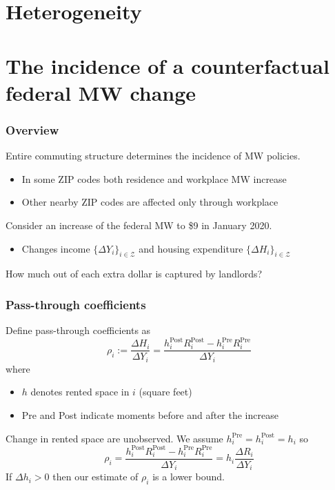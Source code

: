 \documentclass[aspectratio=169, t]{beamer}
\newcommand{\Z}{\mathcal{Z}}
\begin{document}
\section{Heterogeneity}

\section{The incidence of a counterfactual federal MW change}

\begin{frame}
    \frametitle{Overview}
    
    Entire commuting structure determines the incidence of MW policies.
    \begin{itemize}
    	\vspace{1mm}
    	\item In some ZIP codes both residence and workplace MW increase
    	\vspace{1mm}
    	\item Other nearby ZIP codes are affected only through workplace
    \end{itemize}
    
    \pause
    \vspace{3mm}
    Consider an increase of the federal MW to \$9 in January 2020.
    \begin{itemize}
    	\vspace{1mm}
    	\item Changes income $\{\Delta Y_i\}_{i\in\Z}$ and housing expenditure $\{\Delta H_i\}_{i\in\Z}$
    \end{itemize}
    
    \pause
    \vspace{3mm}
    How much out of each extra dollar is captured by landlords?
   
\end{frame}

\begin{frame}
	\frametitle{Pass-through coefficients}

	Define pass-through coefficients as	
	\begin{equation*}
		\rho_i := \frac{\Delta H_i}{\Delta Y_i} =  \frac{h^{\text{Post}}_i R^{\text{Post}}_i - h^{\text{Pre}}_i R^{\text{Pre}}_i}{\Delta Y_i}
	\end{equation*}
	where 
	\begin{itemize}
		\item $h$ denotes rented space in $i$ (square feet)
		\item Pre and Post indicate moments before and after the increase
	\end{itemize}

	\pause
	\vspace{3mm}
	Change in rented space are unobserved. We assume $h^{\text{Pre}}_i = h^{\text{Post}}_i = h_i$ so
	\begin{equation*}
		\rho_i = \frac{h^{\text{Post}}_i R^{\text{Post}}_i - h^{\text{Pre}}_i R^{\text{Pre}}_i}{\Delta Y_i} = h_i \frac{\Delta R_i}{\Delta Y_i}
	\end{equation*}
	If $\Delta h_i > 0$ then our estimate of $\rho_i$ is a lower bound.

\end{frame}
\end{document}
